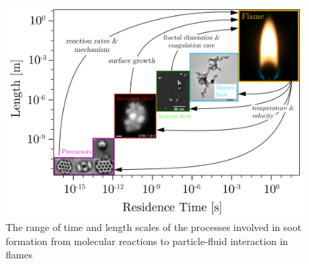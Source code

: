 \begin{figure}[!htbp]
	\centering
	\includegraphics[height=80mm, ]{Figures/Introduction/schematics.jpg}
	\caption{The range of time and length scales of the processes involved in soot formation from molecular reactions to particle-fluid interaction in flames}
	\label{fig:sootscales}
\end{figure}





